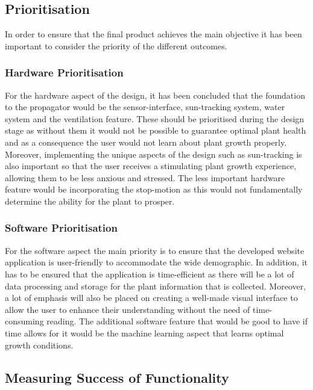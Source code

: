 \documentclass{article}
\begin{document}
\subsection{Prioritisation}
In order to ensure that the final product achieves the main objective it has been important to consider the priority of the different outcomes.

\subsubsection{Hardware Prioritisation}
For the hardware aspect of the design, it has been concluded that the foundation to the propagator would be the sensor-interface, sun-tracking system, water system and the ventilation feature. These should be prioritised during the design stage as without them it would not be possible to guarantee optimal plant health and as a consequence the user would not learn about plant growth properly. Moreover, implementing the unique aspects of the design such as sun-tracking is also important so that the user receives a stimulating plant growth experience, allowing them to be less anxious and stressed. The less important hardware feature would be incorporating the stop-motion as this would not fundamentally determine the ability for the plant to prosper.

\subsubsection{Software Prioritisation}
For the software aspect the main priority is to ensure that the developed website application is user-friendly to accommodate the wide demographic. In addition, it has to be ensured that the application is time-efficient as there will be a lot of data processing and storage for the plant information that is collected. Moreover, a lot of emphasis will also be placed on creating a well-made visual interface to allow the user to enhance their understanding without the need of time-consuming reading. The additional software feature that would be good to have if time allows for it would be the machine learning aspect that learns optimal growth conditions.

\subsection{Measuring Success of Functionality}
\end{document}

